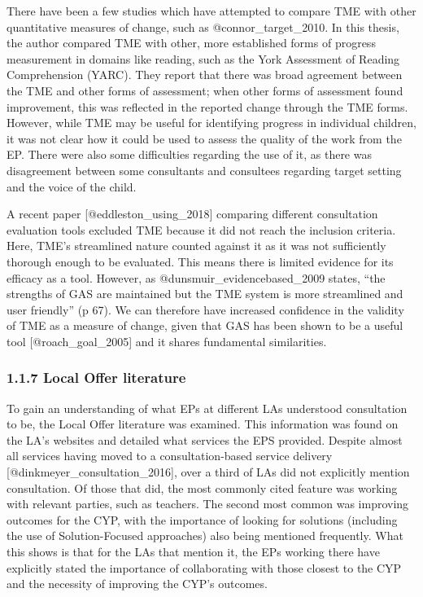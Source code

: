 \documentclass[
]{article}
\begin{document}
There have been a few studies which have attempted to compare TME with
other quantitative measures of change, such as @connor\_target\_2010. In
this thesis, the author compared TME with other, more established forms
of progress measurement in domains like reading, such as the York
Assessment of Reading Comprehension (YARC). They report that there was
broad agreement between the TME and other forms of assessment; when
other forms of assessment found improvement, this was reflected in the
reported change through the TME forms. However, while TME may be useful
for identifying progress in individual children, it was not clear how it
could be used to assess the quality of the work from the EP. There were
also some difficulties regarding the use of it, as there was
disagreement between some consultants and consultees regarding target
setting and the voice of the child.

A recent paper {[}@eddleston\_using\_2018{]} comparing different
consultation evaluation tools excluded TME because it did not reach the
inclusion criteria. Here, TME's streamlined nature counted against it as
it was not sufficiently thorough enough to be evaluated. This means
there is limited evidence for its efficacy as a tool. However, as
@dunsmuir\_evidencebased\_2009 states, ``the strengths of GAS are
maintained but the TME system is more streamlined and user friendly'' (p
67). We can therefore have increased confidence in the validity of TME
as a measure of change, given that GAS has been shown to be a useful
tool {[}@roach\_goal\_2005{]} and it shares fundamental similarities.

\hypertarget{local-offer-literature}{%
\subsubsection{1.1.7 Local Offer
literature}\label{local-offer-literature}}

To gain an understanding of what EPs at different LAs understood
consultation to be, the Local Offer literature was examined. This
information was found on the LA's websites and detailed what services
the EPS provided. Despite almost all services having moved to a
consultation-based service delivery
{[}@dinkmeyer\_consultation\_2016{]}, over a third of LAs did not
explicitly mention consultation. Of those that did, the most commonly
cited feature was working with relevant parties, such as teachers. The
second most common was improving outcomes for the CYP, with the
importance of looking for solutions (including the use of
Solution-Focused approaches) also being mentioned frequently. What this
shows is that for the LAs that mention it, the EPs working there have
explicitly stated the importance of collaborating with those closest to
the CYP and the necessity of improving the CYP's outcomes.
\end{document}
